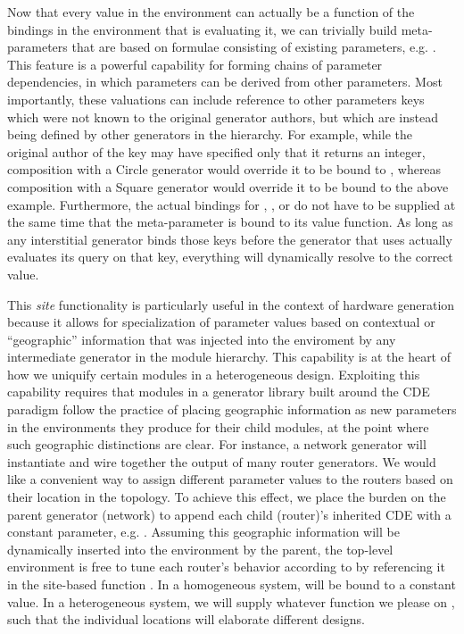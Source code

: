 Now that every value in the environment can actually be a function of the bindings in the environment that is evaluating it, we can trivially
build meta-parameters that are based on formulae consisting of existing parameters, e.g. .
This feature is a powerful capability for forming chains of parameter dependencies, in which parameters can be derived from other parameters.
Most importantly, these valuations can include reference to other parameters keys which were not known to the original generator authors,
but which are instead being defined by other generators in the hierarchy.
For example, while the original author of the  key may have specified only that it returns an integer,
composition with a Circle generator would override it to be bound to , whereas
composition with a Square generator would override it to be bound to the above example.
Furthermore, the actual bindings for , , or  do not have to be supplied at the same time that
the meta-parameter  is bound to its value function.
As long as any interstitial generator binds those keys before the generator that uses  actually evaluates its query on that key,
everything will dynamically resolve to the correct value.

This \emph{site} functionality is particularly useful in the context of hardware generation because 
it allows for specialization of parameter values based on contextual or ``geographic'' information that was injected into the enviroment by any intermediate generator in the module hierarchy.
This capability is at the heart of how we uniquify certain modules in a heterogeneous design.
Exploiting this capability requires that modules in a generator library built around the CDE paradigm follow the practice of placing geographic information
as new parameters in the environments they produce for their child modules, at the point where such geographic distinctions are clear. 
For instance, a network generator will instantiate and wire together the output of many router generators.
We would like a convenient way to assign different parameter values to the routers based on their location in the topology.
To achieve this effect, we place the burden on the parent generator (network) to append each child (router)'s inherited CDE with a constant parameter, e.g. .
Assuming this geographic information will be dynamically inserted into the environment by the parent,
the top-level environment is free to tune each router's behavior according to 
by referencing it in the site-based function .
In a homogeneous system,  will be bound to a constant value.
In a heterogeneous system, we will supply whatever function we please on ,
such that the individual locations will elaborate different designs.

